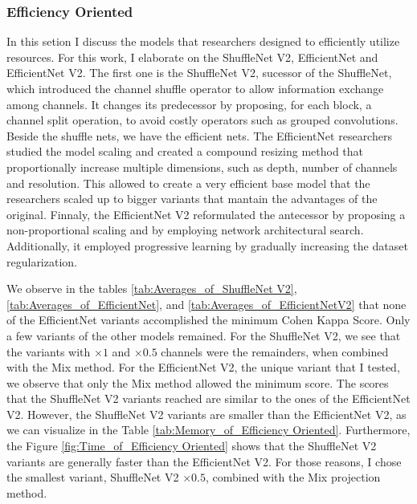 

\FloatBarrier

\subsubsection{Efficiency Oriented}

In this setion I discuss the models that researchers designed to efficiently utilize resources. For this work, I elaborate on the ShuffleNet V2, EfficientNet and EfficientNet V2. The first one is the ShuffleNet V2, sucessor of the ShuffleNet, which introduced the channel shuffle operator to allow information exchange among channels. It changes its predecessor by proposing, for each block, a channel split operation, to avoid costly operators such as grouped convolutions. Beside the shuffle nets, we have the efficient nets. The EfficientNet researchers studied the model scaling and created a compound resizing method that proportionally increase multiple dimensions, such as depth, number of channels and resolution. This allowed to create a very efficient base model that the researchers scaled up to bigger variants that mantain the advantages of the original. Finnaly, the EfficientNet V2 reformulated the antecessor by proposing a non-proportional scaling and by employing network architectural search. Additionally, it employed progressive learning by gradually increasing the dataset regularization.  

We observe in the tables \ref{tab:Averages_of_ShuffleNet V2}, \ref{tab:Averages_of_EfficientNet}, and \ref{tab:Averages_of_EfficientNetV2} that none of the EfficientNet variants accomplished the minimum Cohen Kappa Score. Only a few variants of the other models remained. For the ShuffleNet V2, we see that the variants with $\times 1$ and $\times 0.5$ channels were the remainders, when combined with the \gls{Mix} method. For the EfficientNet V2, the unique variant that I tested, we observe that only the \gls{Mix} method allowed the minimum score. The scores that the ShuffleNet V2 variants reached are similar to the ones of the EfficientNet V2. However, the ShuffleNet V2 variants are smaller than the EfficientNet V2, as we can visualize in the Table \ref{tab:Memory_of_Efficiency Oriented}. Furthermore, the Figure \ref{fig:Time_of_Efficiency Oriented} shows that the ShuffleNet V2 variants are generally faster than the EfficientNet V2. For those reasons, I chose the smallest variant, ShuffleNet V2 $\times 0.5$, combined with the \gls{Mix} projection method. 

